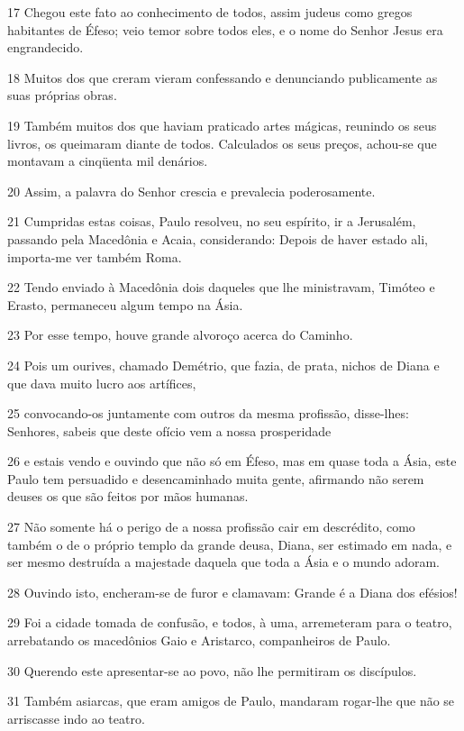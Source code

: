\par 17 Chegou este fato ao conhecimento de todos, assim judeus como gregos habitantes de Éfeso; veio temor sobre todos eles, e o nome do Senhor Jesus era engrandecido.
\par 18 Muitos dos que creram vieram confessando e denunciando publicamente as suas próprias obras.
\par 19 Também muitos dos que haviam praticado artes mágicas, reunindo os seus livros, os queimaram diante de todos. Calculados os seus preços, achou-se que montavam a cinqüenta mil denários.
\par 20 Assim, a palavra do Senhor crescia e prevalecia poderosamente.
\par 21 Cumpridas estas coisas, Paulo resolveu, no seu espírito, ir a Jerusalém, passando pela Macedônia e Acaia, considerando: Depois de haver estado ali, importa-me ver também Roma.
\par 22 Tendo enviado à Macedônia dois daqueles que lhe ministravam, Timóteo e Erasto, permaneceu algum tempo na Ásia.
\par 23 Por esse tempo, houve grande alvoroço acerca do Caminho.
\par 24 Pois um ourives, chamado Demétrio, que fazia, de prata, nichos de Diana e que dava muito lucro aos artífices,
\par 25 convocando-os juntamente com outros da mesma profissão, disse-lhes: Senhores, sabeis que deste ofício vem a nossa prosperidade
\par 26 e estais vendo e ouvindo que não só em Éfeso, mas em quase toda a Ásia, este Paulo tem persuadido e desencaminhado muita gente, afirmando não serem deuses os que são feitos por mãos humanas.
\par 27 Não somente há o perigo de a nossa profissão cair em descrédito, como também o de o próprio templo da grande deusa, Diana, ser estimado em nada, e ser mesmo destruída a majestade daquela que toda a Ásia e o mundo adoram.
\par 28 Ouvindo isto, encheram-se de furor e clamavam: Grande é a Diana dos efésios!
\par 29 Foi a cidade tomada de confusão, e todos, à uma, arremeteram para o teatro, arrebatando os macedônios Gaio e Aristarco, companheiros de Paulo.
\par 30 Querendo este apresentar-se ao povo, não lhe permitiram os discípulos.
\par 31 Também asiarcas, que eram amigos de Paulo, mandaram rogar-lhe que não se arriscasse indo ao teatro.
